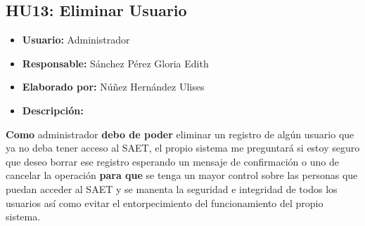 \subsection{HU13: Eliminar Usuario}
\begin{itemize}
	\item \textbf{Usuario:} Administrador
	\item \textbf{Responsable:} Sánchez Pérez Gloria Edith
	\item \textbf{Elaborado por:} Núñez Hernández Ulises
	\item \textbf{Descripción:}
\end{itemize}
\textbf{Como} administrador \textbf{debo de poder} eliminar un registro de algún usuario que ya no deba tener acceso al SAET, el propio sistema me preguntará si estoy seguro que deseo borrar ese registro esperando un mensaje de confirmación o uno de cancelar la operación \textbf{para que} se tenga un mayor control sobre las personas que puedan acceder al SAET y se manenta la seguridad e integridad de todos los usuarios así como evitar el entorpecimiento del funcionamiento del propio sistema. 